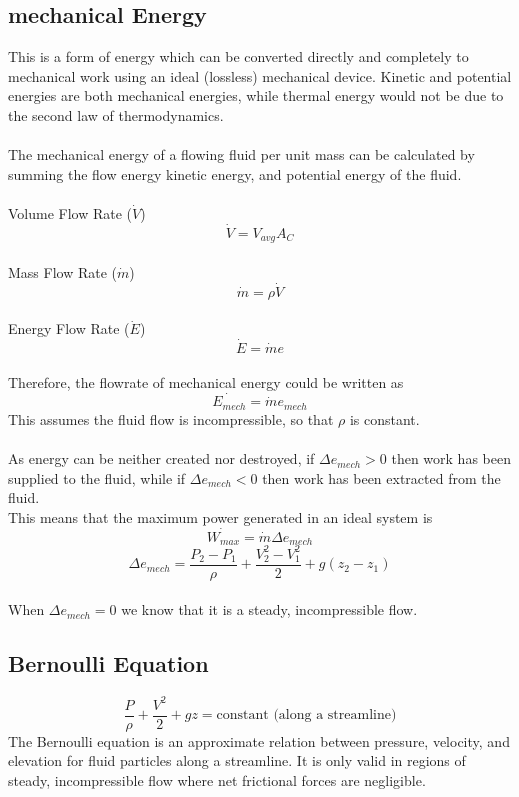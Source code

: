 \documentclass[12pt,a4paper]{article}
\begin{document}
    \subsection{mechanical Energy}
        This is a form of energy which can be converted directly and completely to mechanical work using an ideal (lossless) mechanical device. Kinetic and potential energies are both mechanical energies, while thermal energy would not be due to the second law of thermodynamics. \\
        \\
        The mechanical energy of a flowing fluid per unit mass can be calculated by summing the flow energy kinetic energy, and potential energy of the fluid. \\
        \\
        Volume Flow Rate ($\dot{V}$)
        \[\dot{V}=V_{avg}A_C\]
        \\
        Mass Flow Rate ($\dot{m}$)
        \[\dot{m}=\rho \dot{V}\]
        \\
        Energy Flow Rate ($\dot{E}$)
        \[\dot{E}=\dot{m}e\]
        \\
        Therefore, the flowrate of mechanical energy could be written as 
        \[\dot{E_{mech}}=\dot{m}e_{mech}\]
        This  assumes the fluid flow is incompressible, so that $\rho$ is constant. \\
        \\
        As energy can be neither created nor destroyed, if $\Delta e_{mech}>0$ then work has been supplied to the fluid, while if $\Delta e_{mech}<0$ then work has been extracted from the fluid.\\
        This means that the maximum power generated in an ideal system is 
        \[\dot{W_{max}}=\dot{m} \Delta e_{mech}\]
        \[\Delta e_{mech}=\frac{P_2-P_1}{\rho}+\frac{V^2_2-V^2_1}{2}+g(z_2-z_1)\]
        \\
        When $\Delta e_{mech} =0$ we know that it is a steady, incompressible flow. 

    \subsection{Bernoulli Equation}
        \[\frac{P}{\rho}+\frac{V^2}{2}+gz=\text{constant (along a streamline)}\]
        The Bernoulli equation is an approximate relation between pressure, velocity, and elevation for fluid particles along a streamline. It is only valid in regions of steady, incompressible flow where net frictional forces are negligible.
        
\end{document}
